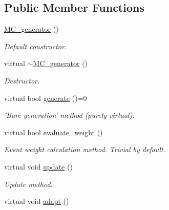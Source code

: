 \subsection*{Public Member Functions}
\begin{DoxyCompactItemize}
\item 
\hypertarget{a00362_a8d50bbf51d222365ff5fb023ff67c2b3}{\hyperlink{a00362_a8d50bbf51d222365ff5fb023ff67c2b3}{M\-C\-\_\-generator} ()}\label{a00362_a8d50bbf51d222365ff5fb023ff67c2b3}

\begin{DoxyCompactList}\small\item\em Default constructor. \end{DoxyCompactList}\item 
\hypertarget{a00362_aef838e5722046a65dd68ea9737c6c8e9}{virtual \hyperlink{a00362_aef838e5722046a65dd68ea9737c6c8e9}{$\sim$\-M\-C\-\_\-generator} ()}\label{a00362_aef838e5722046a65dd68ea9737c6c8e9}

\begin{DoxyCompactList}\small\item\em Destructor. \end{DoxyCompactList}\item 
virtual bool \hyperlink{a00362_a197b7bb66d8de5f6de401f81bea71e6c}{generate} ()=0
\begin{DoxyCompactList}\small\item\em 'Bare generation' method (purely virtual). \end{DoxyCompactList}\item 
\hypertarget{a00362_a5c11c9e46b6fa1bcc3dac00286294ec1}{virtual bool \hyperlink{a00362_a5c11c9e46b6fa1bcc3dac00286294ec1}{evaluate\-\_\-weight} ()}\label{a00362_a5c11c9e46b6fa1bcc3dac00286294ec1}

\begin{DoxyCompactList}\small\item\em Event weight calculation method. Trivial by default. \end{DoxyCompactList}\item 
virtual void \hyperlink{a00362_ae5e70cee65aacbb6a556057de02ef3dd}{update} ()
\begin{DoxyCompactList}\small\item\em Update method. \end{DoxyCompactList}\item 
\hypertarget{a00362_a521f3349a4c6b6acfeb6fa8800f7bfab}{virtual void \hyperlink{a00362_a521f3349a4c6b6acfeb6fa8800f7bfab}{adapt} ()}\label{a00362_a521f3349a4c6b6acfeb6fa8800f7bfab}


\end{DoxyCompactItemize}
